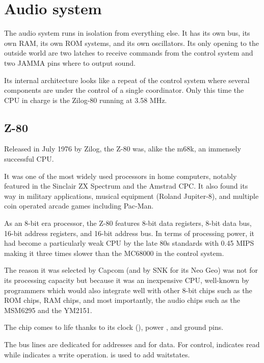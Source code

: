\pagebreak
\section{Audio system}
The audio system runs in isolation from everything else. It has its own bus, its own RAM, its own ROM systems, and its own oscillators. Its only opening to the outside world are two latches to receive commands from the control system and two JAMMA pins where to output sound.

Its internal architecture looks like a repeat of the control system where several components are under the control of a single coordinator. Only this time the CPU in charge is the Zilog-80 running at 3.58 MHz.

\subsection{Z-80}
Released in July 1976 by Zilog, the Z-80 was, alike the m68k, an immensely successful CPU. 

It was one of the most widely used processors in home computers, notably featured in the Sinclair ZX Spectrum and the Amstrad CPC. It also found its way in military applications, musical equipment (Roland Jupiter-8), and multiple coin operated arcade games including Pac-Man. 

As an 8-bit era processor, the Z-80 features 8-bit data registers, 8-bit data bus, 16-bit address registers, and 16-bit address bus. In terms of processing power, it had become a particularly weak CPU by the late 80s standards with 0.45 MIPS making it three times slower than the MC68000 in the control system. 

The reason it was selected by Capcom (and by SNK for its Neo Geo) was not for its processing capacity but because it was an inexpensive CPU, well-known by programmers which would also integrate well with other 8-bit chips such as the ROM chips, RAM chips, and most importantly, the audio chips such as the MSM6295 and the YM2151.






The chip comes to life thanks to its clock (), power , and ground  pins.

The bus lines are dedicated  for addresses and  for data. For control,  indicates read while  indicates a write operation.  is used to add waitstates. 

